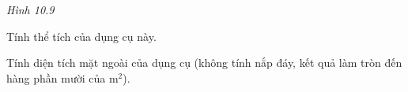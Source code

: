 \begin{practice}
\begin{questions}[resume=SBT]
\begin{center}
            \textit{Hình 10.9}
        \end{center}

        \begin{questions}
            \item Tính thể tích của dụng cụ này.
            \item Tính diện tích mặt ngoài của dụng cụ (không tính nắp đáy, kết quả làm tròn đến hàng phần mười của m$^2$).
        \end{questions}
        \answerline
        \answerline
        \answerline
    \end{questions}
\end{practice}
